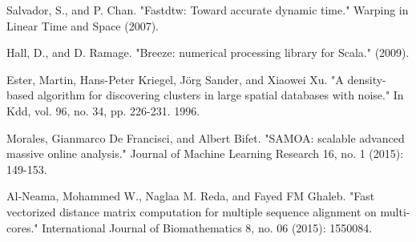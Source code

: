 \begin{thebibliography}{00}
	 Salvador, S., and P. Chan. "Fastdtw: Toward accurate dynamic time." Warping in Linear Time and Space (2007).
	
	 Hall, D., and D. Ramage. "Breeze: numerical processing library for Scala." (2009).

	 Ester, Martin, Hans-Peter Kriegel, Jörg Sander, and Xiaowei Xu. "A density-based algorithm for discovering clusters in large spatial databases with noise." In Kdd, vol. 96, no. 34, pp. 226-231. 1996.
	
	 Morales, Gianmarco De Francisci, and Albert Bifet. "SAMOA: scalable advanced massive online analysis." Journal of Machine Learning Research 16, no. 1 (2015): 149-153.
	
	 Al-Neama, Mohammed W., Naglaa M. Reda, and Fayed FM Ghaleb. "Fast vectorized distance matrix computation for multiple sequence alignment on multi-cores." International Journal of Biomathematics 8, no. 06 (2015): 1550084.
	
\end{thebibliography}

